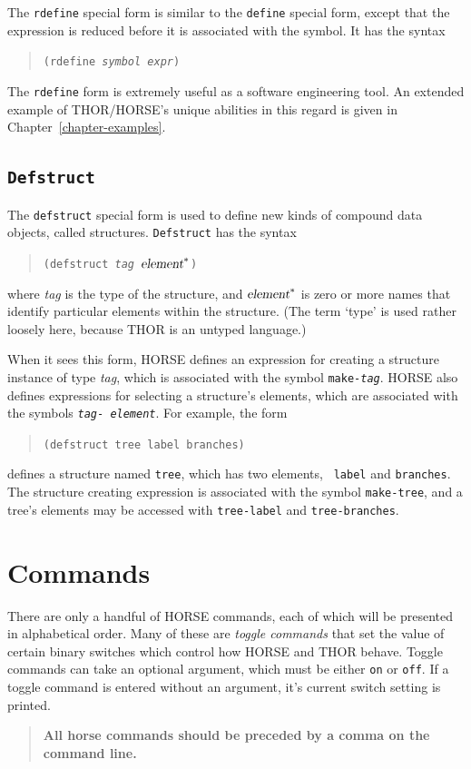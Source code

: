 	The {\tt rdefine} special form is similar to the {\tt define} special
form, except that the expression is reduced before it is associated with
the symbol.  It has the syntax
\begin{quote}
	{\tt (rdefine {\sl symbol  expr})}
\end{quote}
The {\tt rdefine} form is extremely useful as a software engineering
tool.  An extended example of THOR/HORSE's unique abilities in this
regard is given in Chapter~\ref{chapter-examples}.


\subsection{{\tt Defstruct}}
\label{sec-defstruct}
	
	The {\tt defstruct} special form is used to define new kinds of 
compound data objects, called structures.    {\tt Defstruct} has
the syntax
\begin{quote}
	{\tt(defstruct {\sl tag ${\mbox {\sl element}}^*$})}
\end{quote}
where {\sl tag} is the type of the structure, and 
${\mbox {\sl element}}^*$ is zero or more names that identify particular
elements
within the structure.  (The term `type' is used rather loosely here,
because THOR is an untyped language.)  

	When it sees this form, HORSE defines an expression for creating 
a structure instance of type {\sl tag}, which is associated with the
symbol {\tt make-{\sl tag}}.  HORSE also defines expressions for 
selecting a structure's
elements, which are associated with the symbols {\tt{\sl tag}-{\sl
element}}.  For example, the form
\begin{quote}
	{\tt (defstruct tree label branches)}
\end{quote}
defines a structure named {\tt tree}, which has two elements, {\tt
label} and {\tt branches}.  The structure creating expression is
associated with the symbol {\tt make-tree}, and a tree's elements may be
accessed with {\tt tree-label} and {\tt tree-branches}.

	

\section{Commands}

	There are only a handful of HORSE commands, each of which will be
presented in alphabetical order.    Many of these are {\em toggle
commands\/} that set the value of certain binary switches which control how
HORSE and THOR behave.  Toggle commands can take an optional argument, which must be
either {\tt on} or {\tt off}.  If a toggle command is entered without an
argument, it's current switch setting is printed.
\begin{quote}
{\bf All horse commands should be preceded
by a comma on the command line.}
\end{quote}

